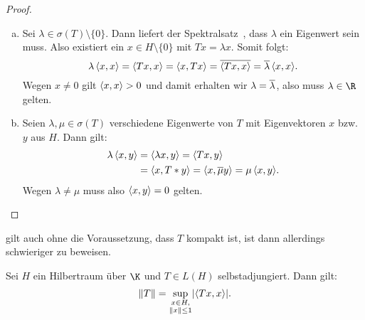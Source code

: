 \begin{proof}
    \begin{enumerate}[(a)]
        \item
            Sei $\lambda\in\sigma(T)\setminus\{0\}$. Dann liefert der
            Spektralsatz~, dass $\lambda$ ein Eigenwert
            sein muss. Also existiert ein $x\in H\setminus\{0\}$ mit $Tx=\lambda
            x$. Somit folgt:
            \[ \lambda \, \SP{x,x}
                = \SP{Tx,x} = \SP{x,Tx} = \ol{\SP{Tx,x}} 
                = \ol\lambda \, \SP{x,x}
            . \]
            Wegen $x\neq0$ gilt $\SP{x,x}>0$ und damit erhalten wir
            $\lambda=\overline\lambda$, also muss $\lambda\in\R$ gelten.
            
        \item
            Seien $\lambda,\mu\in\sigma(T)$ verschiedene Eigenwerte von $T$ mit
            Eigenvektoren $x$ bzw. $y$ aus $H$. Dann gilt:
            \begin{align*}
                \lambda\, \SP{x,y} &= \SP{\lambda x, y} = \SP{Tx,y} \\
                &= \SP{x,T*y} = \SP{x,\ol\mu y} = \mu \, \SP{x,y}
            . \end{align*}
            Wegen $\lambda\neq\mu$ muss also $\SP{x,y}=0$ gelten.
    \end{enumerate}
\end{proof}

\nnBemerkung
{} gilt auch ohne die Voraussetzung, dass $T$ kompakt ist,
ist dann allerdings schwieriger zu beweisen.

\begin{thSatz} \label{vl22:satz9.6}
    Sei $H$ ein Hilbertraum über $\K$ und $T\in L(H)$ selbstadjungiert. Dann
    gilt:
    \[ \norm{T} = \sup_{\substack{x\in H,\\\norm{x}\leq1}}
        \abs{\SP{Tx,x}}  
    . \]
\end{thSatz}
